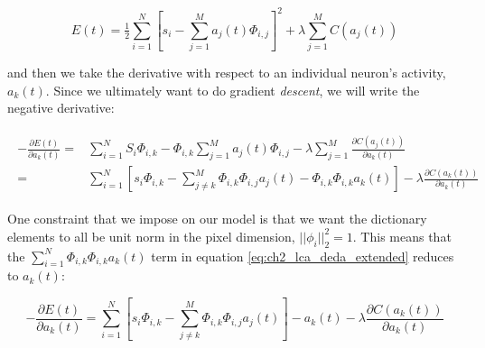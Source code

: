 \begin{equation}\label{eq:ch2_subscript_sparse_energy_func}
    E(t) = \tfrac{1}{2} \sum\limits_{i=1}^{N} \left[ s_{i} - \sum\limits_{j=1}^{M}a_{j}(t) \Phi_{i,j} \right]^{2} + \lambda \sum\limits_{j=1}^{M} C(a_{j}(t))
\end{equation}

and then we take the derivative with respect to an individual neuron's activity, $a_{k}(t)$. Since we ultimately want to do gradient \textit{descent}, we will write the negative derivative:

\begin{align}\label{eq:ch2_lca_deda_extended}
\begin{split}
    - \frac{\partial E(t)}{\partial a_{k}(t)}
    =
        &\sum\limits_{i=1}^{N} S_{i} \Phi_{i,k} -
        \Phi_{i,k}\sum\limits_{j=1}^{M}a_{j}(t) \Phi_{i,j} -
        \lambda \sum\limits_{j=1}^{M}\frac{\partial C(a_{j}(t))}{\partial a_{k}(t)} \\
    =
        &\sum\limits_{i=1}^{N} \left[ s_{i} \Phi_{i,k} -
        \sum\limits_{j \neq k}^{M} \Phi_{i,k} \Phi_{i,j} a_{j}(t) - \Phi_{i,k}\Phi_{i,k}a_{k}(t) \right] -
        \lambda \frac{\partial C(a_{k}(t))}{\partial a_{k}(t)}
\end{split}
\end{align}

One constraint that we impose on our model is that we want the dictionary elements to all be unit norm in the pixel dimension, $||\phi_{i}||_2^2 = 1$. This means that the $\sum_{i=1}^{N}\Phi_{i,k}\Phi_{i,k}a_{k}(t)$ term in equation \eqref{eq:ch2_lca_deda_extended} reduces to $a_k(t)$:

\begin{equation}\label{eq:ch2_lca_deda}
    -\frac{\partial E(t)}{\partial a_{k}(t)} =
    \sum\limits_{i=1}^{N} \left[ s_{i} \Phi_{i,k} -
    \sum\limits_{j \neq k}^{M} \Phi_{i,k} \Phi_{i,j} a_{j}(t) \right] - a_{k}(t) -
    \lambda \frac{\partial C(a_{k}(t))}{\partial a_{k}(t)}
\end{equation}


